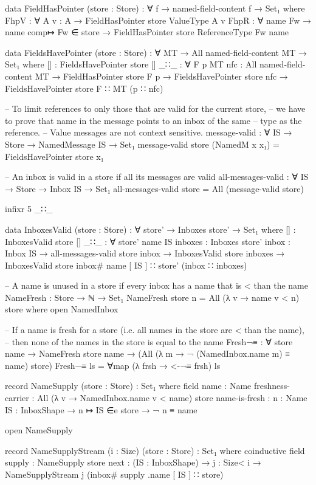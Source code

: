 \begin{code}
data FieldHasPointer (store : Store) : ∀ {f} → named-field-content f → Set₁ where
  FhpV : ∀ {A} {v : A} → FieldHasPointer store {ValueType A} v
  FhpR : ∀ {name Fw} → name comp↦ Fw ∈ store → FieldHasPointer store {ReferenceType Fw} name

data FieldsHavePointer (store : Store) : ∀ {MT} → All named-field-content MT → Set₁ where
  [] : FieldsHavePointer store []
  _∷_ : ∀ {F p MT} {nfc : All named-field-content MT} →
    FieldHasPointer store {F} p →
    FieldsHavePointer store nfc →
    FieldsHavePointer store {F ∷ MT} (p ∷ nfc)

-- To limit references to only those that are valid for the current store,
-- we have to prove that name in the message points to an inbox of the same
-- type as the reference.
-- Value messages are not context sensitive.
message-valid : ∀ {IS} → Store → NamedMessage IS → Set₁
message-valid store (NamedM x x₁) = FieldsHavePointer store x₁

-- An inbox is valid in a store if all its messages are valid
all-messages-valid : ∀ {IS} → Store → Inbox IS → Set₁
all-messages-valid store = All (message-valid store)

infixr 5 _∷_

data InboxesValid (store : Store) : ∀ {store'} → Inboxes store' → Set₁ where
  [] : InboxesValid store []
  _∷_ : ∀ {store' name IS} {inboxes : Inboxes store'} {inbox : Inbox IS} →
    all-messages-valid store inbox →
    InboxesValid store inboxes →
    InboxesValid store {inbox# name [ IS ] ∷ store'} (inbox ∷ inboxes)

-- A name is unused in a store if every inbox has a name that is < than the name
NameFresh : Store → ℕ → Set₁
NameFresh store n = All (λ v → name v < n) store
  where open NamedInbox

-- If a name is fresh for a store (i.e. all names in the store are < than the name),
-- then none of the names in the store is equal to the name
Fresh¬≡ : ∀ {store name } → NameFresh store name → (All (λ m → ¬ (NamedInbox.name m) ≡ name) store)
Fresh¬≡ ls = ∀map (λ frsh → <-¬≡ frsh) ls

record NameSupply (store : Store) : Set₁ where
  field
    name : Name
    freshness-carrier : All (λ v → NamedInbox.name v < name) store
    name-is-fresh : {n : Name} {IS : InboxShape} → n ↦ IS ∈e store → ¬ n ≡ name

open NameSupply

record NameSupplyStream (i : Size) (store : Store) : Set₁ where
  coinductive
  field
    supply : NameSupply store
    next : (IS : InboxShape) → {j : Size< i} → NameSupplyStream j (inbox# supply .name [ IS ] ∷ store)



\end{code}
